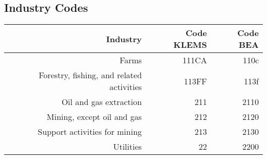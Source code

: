 
\begin{landscape}
    \section{Industry Codes}\label{sec:industry_codes}
\begin{table}[h]
\begin{center}
\begin{tabular}{rrr}
Industry                                                             & Code KLEMS & Code BEA   \\%
\hline\hline
Farms                                                                & 111CA       & 110c      \\%
Forestry, fishing, and related activities                            & 113FF       & 113f      \\%
Oil and gas extraction                                               & 211         & 2110      \\%
Mining, except oil and gas                                           & 212         & 2120      \\%
Support activities for mining                                        & 213         & 2130      \\%
Utilities                                                            & 22          & 2200      \\%

\end{tabular}
\end{center}
\end{table}
\end{landscape}
